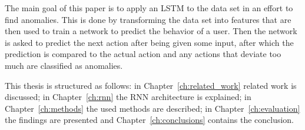 The main goal of this paper is to apply an LSTM to the data set in an effort to find anomalies. This is done by transforming the data set into features that are then used to train a network to predict the behavior of a user. Then the network is asked to predict the next action after being given some input, after which the prediction is compared to the actual action and any actions that deviate too much are classified as anomalies.

This thesis is structured as follows: in Chapter~\ref{ch:related_work} related work is discussed; in Chapter~\ref{ch:rnn} the RNN architecture is explained; in Chapter~\ref{ch:methods} the used methods are described; in Chapter~\ref{ch:evaluation} the findings are presented and Chapter~\ref{ch:conclusions} contains the conclusion.